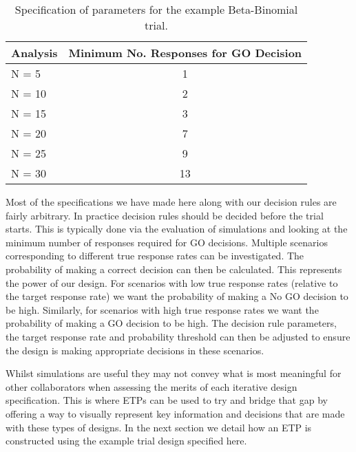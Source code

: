 \begin{table}[h!]
	\centering
	\caption{Specification of parameters for the example Beta-Binomial trial.}
	\label{tab_etp:exampleBBspecs}
	\begin{tabular}{l|c}
		\hline
		\textbf{Analysis}     & \textbf{Minimum No. Responses for GO Decision}               \\ \hline
		N = 5  & 1                            \\
		N = 10 & 2                            \\
		N = 15 & 3                           \\
		N = 20 & 7                            \\
		N = 25 & 9                         \\
		N = 30 & 13                  \\ \hline
	\end{tabular}
\end{table}

Most of the specifications we have made here along with our decision rules are fairly arbitrary. In practice decision rules should be decided before the trial starts. This is typically done via the evaluation of simulations and looking at the minimum number of responses required for GO decisions. Multiple scenarios corresponding to different true response rates can be investigated. The probability of making a correct decision can then be calculated. This represents the power of our design. For scenarios with low true response rates (relative to the target response rate) we want the probability of making a No GO decision to be high. Similarly, for scenarios with high true response rates we want the probability of making a GO decision to be high. The decision rule parameters, the target response rate and probability threshold can then be adjusted to ensure the design is making appropriate decisions in these scenarios. 	

Whilst simulations are useful they may not convey what is most meaningful for other collaborators when assessing the merits of each iterative design specification. This is where ETPs can be used to try and bridge that gap by offering a way to visually represent key information and decisions that are made with these types of designs. In the next section we detail how an ETP is constructed using the example trial design specified here. 



